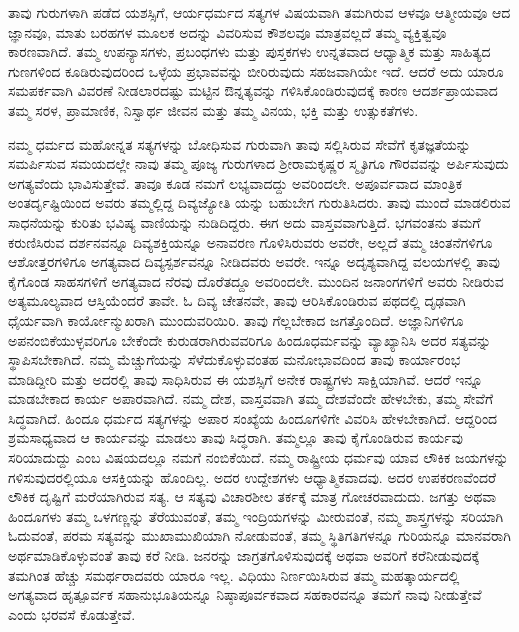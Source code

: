 ತಾವು ಗುರುಗಳಾಗಿ ಪಡೆದ ಯಶಸ್ಸಿಗೆ, ಆರ್ಯಧರ್ಮದ ಸತ್ಯಗಳ ವಿಷಯವಾಗಿ ತಮಗಿರುವ ಆಳವೂ ಆತ್ಮೀಯವೂ ಆದ ಜ್ಞಾನವೂ, ಮಾತು ಬರಹಗಳ ಮೂಲಕ ಅದನ್ನು ವಿವರಿಸುವ ಕೌಶಲವೂ ಮಾತ್ರವಲ್ಲದೆ ತಮ್ಮ ವ್ಯಕ್ತಿತ್ವವೂ ಕಾರಣವಾಗಿದೆ. ತಮ್ಮ ಉಪನ್ಯಾಸಗಳು, ಪ್ರಬಂಧಗಳು ಮತ್ತು ಪುಸ್ತಕಗಳು ಉನ್ನತವಾದ ಆಧ್ಯಾತ್ಮಿಕ ಮತ್ತು ಸಾಹಿತ್ಯದ ಗುಣಗಳಿಂದ ಕೂಡಿರುವುದರಿಂದ ಒಳ್ಳೆಯ ಪ್ರಭಾವವನ್ನು ಬೀರಿರುವುದು ಸಹಜವಾಗಿಯೇ ಇದೆ. ಆದರೆ ಅದು ಯಾರೂ ಸಮಪರ್ಕವಾಗಿ ವಿವರಣೆ ನೀಡಲಾರದಷ್ಟು ಮಟ್ಟಿನ ಔನ್ನತ್ಯವನ್ನು ಗಳಿಸಿಕೊಂಡಿರುವುದಕ್ಕೆ ಕಾರಣ ಆದರ್ಶಪ್ರಾಯವಾದ ತಮ್ಮ ಸರಳ, ಪ್ರಾಮಾಣಿಕ, ನಿಸ್ವಾರ್ಥ ಜೀವನ ಮತ್ತು ತಮ್ಮ ವಿನಯ, ಭಕ್ತಿ ಮತ್ತು ಉತ್ಸುಕತೆಗಳು. 

ನಮ್ಮ ಧರ್ಮದ ಮಹೋನ್ನತ ಸತ್ಯಗಳನ್ನು ಬೋಧಿಸುವ ಗುರುವಾಗಿ ತಾವು ಸಲ್ಲಿಸಿರುವ ಸೇವೆಗೆ ಕೃತಜ್ಞತೆಯನ್ನು ಸಮರ್ಪಿಸುವ ಸಮಯದಲ್ಲೇ ನಾವು ತಮ್ಮ ಪೂಜ್ಯ ಗುರುಗಳಾದ ಶ‍್ರೀರಾಮಕೃಷ್ಣರ ಸ್ಮೃತಿಗೂ ಗೌರವವನ್ನು ಅರ್ಪಿಸುವುದು ಅಗತ್ಯವೆಂದು ಭಾವಿಸುತ್ತೇವೆ. ತಾವೂ ಕೂಡ ನಮಗೆ ಲಭ್ಯವಾದದ್ದು ಅವರಿಂದಲೇ. ಅಪೂರ್ವವಾದ ಮಾಂತ್ರಿಕ ಅಂತರ್ದೃಷ್ಟಿಯಿಂದ ಅವರು ತಮ್ಮಲ್ಲಿದ್ದ ದಿವ್ಯಜ್ಯೋತಿ ಯನ್ನು ಬಹುಬೇಗ ಗುರುತಿಸಿದರು. ತಾವು ಮುಂದೆ ಮಾಡಲಿರುವ ಸಾಧನೆಯನ್ನು ಕುರಿತು ಭವಿಷ್ಯ ವಾಣಿಯನ್ನು ನುಡಿದಿದ್ದರು. ಈಗ ಅದು ವಾಸ್ತವವಾಗುತ್ತಿದೆ. ಭಗವಂತನು ತಮಗೆ ಕರುಣಿಸಿರುವ ದರ್ಶನವನ್ನೂ ದಿವ್ಯಶಕ್ತಿಯನ್ನೂ ಅನಾವರಣ ಗೊಳಿಸಿರುವರು ಅವರೇ, ಅಲ್ಲದೆ ತಮ್ಮ ಚಿಂತನೆಗಳಿಗೂ ಆಶೋತ್ತರಗಳಿಗೂ ಅಗತ್ಯವಾದ ದಿವ್ಯಸ್ಪರ್ಶವನ್ನೂ ನೀಡಿದವರು ಅವರೇ. ಇನ್ನೂ ಅದೃಶ್ಯವಾಗಿದ್ದ ವಲಯಗಳಲ್ಲಿ ತಾವು ಕೈಗೊಂಡ ಸಾಹಸಗಳಿಗೆ ಅಗತ್ಯವಾದ ನೆರವು ದೊರೆತದ್ದೂ ಅವರಿಂದಲೇ. ಮುಂದಿನ ಜನಾಂಗಗಳಿಗೆ ಅವರು ನೀಡಿರುವ ಅತ್ಯಮೂಲ್ಯವಾದ ಆಸ್ತಿಯೆಂದರೆ ತಾವೇ. ಓ ದಿವ್ಯ ಚೇತನವೇ, ತಾವು ಆರಿಸಿಕೊಂಡಿರುವ ಪಥದಲ್ಲಿ ದೃಢವಾಗಿ ಧೈರ್ಯವಾಗಿ ಕಾರ್ಯೋನ್ಮುಖರಾಗಿ ಮುಂದುವರಿಯಿರಿ. ತಾವು ಗೆಲ್ಲಬೇಕಾದ ಜಗತ್ತೊಂದಿದೆ. ಅಜ್ಞಾನಿಗಳಿಗೂ ಅಪನಂಬಿಕೆಯುಳ್ಳವರಿಗೂ ಬೇಕೆಂದೇ ಕುರುಡರಾಗಿರುವವರಿಗೂ ಹಿಂದೂಧರ್ಮವನ್ನು ವ್ಯಾಖ್ಯಾನಿಸಿ ಅದರ ಸತ್ಯವನ್ನು ಸ್ಥಾಪಿಸಬೇಕಾಗಿದೆ. ನಮ್ಮ ಮೆಚ್ಚುಗೆಯನ್ನು ಸೆಳೆದುಕೊಳ್ಳುವಂತಹ ಮನೋಭಾವದಿಂದ ತಾವು ಕಾರ್ಯಾರಂಭ ಮಾಡಿದ್ದೀರಿ ಮತ್ತು ಅದರಲ್ಲಿ ತಾವು ಸಾಧಿಸಿರುವ ಈ ಯಶಸ್ಸಿಗೆ ಅನೇಕ ರಾಷ್ಟ್ರಗಳು ಸಾಕ್ಷಿಯಾಗಿವೆ. ಆದರೆ ಇನ್ನೂ ಮಾಡಬೇಕಾದ ಕಾರ್ಯ ಅಪಾರವಾಗಿದೆ. ನಮ್ಮ ದೇಶ, ವಾಸ್ತವವಾಗಿ ತಮ್ಮ ದೇಶವೆಂದೇ ಹೇಳಬೇಕು, ತಮ್ಮ ಸೇವೆಗೆ ಸಿದ್ಧವಾಗಿದೆ. ಹಿಂದೂ ಧರ್ಮದ ಸತ್ಯಗಳನ್ನು ಅಪಾರ ಸಂಖ್ಯೆಯ ಹಿಂದೂಗಳಿಗೇ ವಿವರಿಸಿ ಹೇಳಬೇಕಾಗಿದೆ. ಆದ್ದರಿಂದ ಶ್ರಮಸಾಧ್ಯವಾದ ಆ ಕಾರ್ಯವನ್ನು ಮಾಡಲು ತಾವು ಸಿದ್ಧರಾಗಿ. ತಮ್ಮಲ್ಲೂ ತಾವು ಕೈಗೊಂಡಿರುವ ಕಾರ್ಯವು ಸರಿಯಾದುದ್ದು ಎಂಬ ವಿಷಯದಲ್ಲೂ ನಮಗೆ ನಂಬಿಕೆಯಿದೆ. ನಮ್ಮ ರಾಷ್ಟ್ರೀಯ ಧರ್ಮವು ಯಾವ ಲೌಕಿಕ ಜಯಗಳನ್ನು ಗಳಿಸುವುದರಲ್ಲಿಯೂ ಆಸಕ್ತಿಯನ್ನು ಹೊಂದಿಲ್ಲ. ಅದರ ಉದ್ದೇಶಗಳು ಆಧ್ಯಾತ್ಮಿಕವಾದವು. ಅದರ ಉಪಕರಣವೆಂದರೆ ಲೌಕಿಕ ದೃಷ್ಟಿಗೆ ಮರೆಯಾಗಿರುವ ಸತ್ಯ. ಆ ಸತ್ಯವು ವಿಚಾರಶೀಲ ತರ್ಕಕ್ಕೆ ಮಾತ್ರ ಗೋಚರವಾದುದು. ಜಗತ್ತು ಅಥವಾ ಹಿಂದೂಗಳು ತಮ್ಮ ಒಳಗಣ್ಣನ್ನು ತೆರೆಯುವಂತೆ, ತಮ್ಮ ಇಂದ್ರಿಯಗಳನ್ನು ಮೀರುವಂತೆ, ನಮ್ಮ ಶಾಸ್ತ್ರಗಳನ್ನು ಸರಿಯಾಗಿ ಓದುವಂತೆ, ಪರಮ ಸತ್ಯವನ್ನು ಮುಖಾಮುಖಿಯಾಗಿ ನೋಡುವಂತೆ, ತಮ್ಮ ಸ್ಥಿತಿಗತಿಗಳನ್ನೂ ಗುರಿಯನ್ನೂ ಮಾನವರಾಗಿ ಅರ್ಥಮಾಡಿಕೊಳ್ಳುವಂತೆ ತಾವು ಕರೆ ನೀಡಿ. ಜನರನ್ನು ಜಾಗ್ರತಗೊಳಿಸುವುದಕ್ಕೆ ಅಥವಾ ಅವರಿಗೆ ಕರೆನೀಡುವುದಕ್ಕೆ ತಮಗಿಂತ ಹೆಚ್ಚು ಸಮರ್ಥರಾದವರು ಯಾರೂ ಇಲ್ಲ. ವಿಧಿಯು ನಿರ್ಣಯಿಸಿರುವ ತಮ್ಮ ಮಹತ್ಕಾರ್ಯದಲ್ಲಿ ಅಗತ್ಯವಾದ ಹೃತ್ಪೂರ್ವಕ ಸಹಾನುಭೂತಿಯನ್ನೂ ನಿಷ್ಠಾಪೂರ್ವಕವಾದ ಸಹಕಾರವನ್ನೂ ತಮಗೆ ನಾವು ನೀಡುತ್ತೇವೆ ಎಂದು ಭರವಸೆ ಕೊಡುತ್ತೇವೆ.

